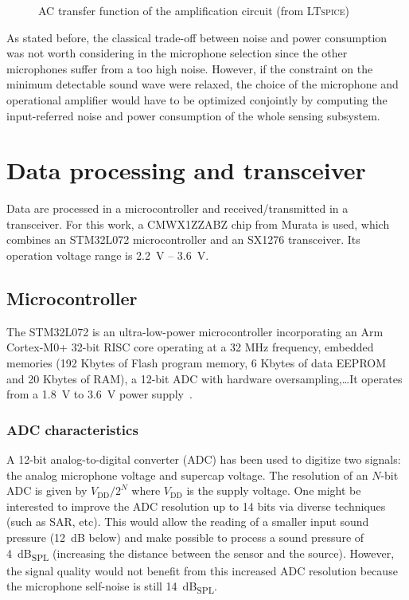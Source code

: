 \documentclass{EPL-master-thesis-covers-EN}
\newcommand{\te}[1]{\textrm{#1}}
\begin{document}
\begin{figure}[H]
    \centering
    
    \caption{AC transfer function of the amplification circuit (from \textsc{LTspice})}
    \label{fig:microphone_AC}
\end{figure}

As stated before, the classical trade-off between noise and power consumption was not worth considering in the microphone selection since the other microphones suffer from a too high noise. However, if the constraint on the minimum detectable sound wave were relaxed, the choice of the microphone and operational amplifier would have to be optimized conjointly by computing the input-referred noise and power consumption of the whole sensing subsystem.


\chapter{Data processing and transceiver}

Data are processed in a microcontroller and received/transmitted in a transceiver. For this work, a CMWX1ZZABZ chip from Murata is used, which combines an STM32L072 microcontroller and an SX1276 transceiver. Its operation voltage range is \SI{2.2}{V} -- \SI{3.6}{V}.

\section{Microcontroller}

The STM32L072 is an ultra-low-power microcontroller incorporating an Arm Cortex-M0+ 32-bit RISC core operating at a 32 MHz frequency, embedded memories (192 Kbytes of Flash program memory, 6 Kbytes of data EEPROM and 20 Kbytes of RAM), a 12-bit ADC with hardware oversampling,\dots It operates from a \SI{1.8}{V} to \SI{3.6}{V} power supply~\cite{STM32L072xx}.

\subsection*{ADC characteristics}

A 12-bit analog-to-digital converter (ADC) has been used to digitize two signals: the analog microphone voltage and supercap voltage. The resolution of an $N$-bit ADC is given by $V_\te{DD}/2^N$ where $V_\te{DD}$ is the supply voltage. One might be interested to improve the ADC resolution up to 14 bits via diverse techniques (such as SAR, etc). This would allow the reading of a smaller input sound pressure (\SI{12}{dB} below) and make possible to process a sound pressure of \SI{4}{dB_{SPL}} (increasing the distance between the sensor and the source). However, the signal quality would not benefit from this increased ADC resolution because the microphone self-noise is still \SI{14}{dB_{SPL}}.
\end{document}
